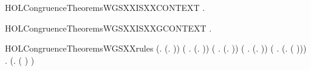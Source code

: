\newcommand{\HOLCongruenceTheoremsWGSXXind}{\UseVerbatim{HOLCongruenceTheoremsWGSXXind}}
\begin{SaveVerbatim}{HOLCongruenceTheoremsWGSXXISXXCONTEXT}
\HOLTokenTurnstile{} \HOLSymConst{\HOLTokenForall{}}.   \HOLSymConst{\HOLTokenImp{}}  
\end{SaveVerbatim}
\newcommand{\HOLCongruenceTheoremsWGSXXISXXCONTEXT}{\UseVerbatim{HOLCongruenceTheoremsWGSXXISXXCONTEXT}}
\begin{SaveVerbatim}{HOLCongruenceTheoremsWGSXXISXXGCONTEXT}
\HOLTokenTurnstile{} \HOLSymConst{\HOLTokenForall{}}.   \HOLSymConst{\HOLTokenImp{}}  
\end{SaveVerbatim}
\newcommand{\HOLCongruenceTheoremsWGSXXISXXGCONTEXT}{\UseVerbatim{HOLCongruenceTheoremsWGSXXISXXGCONTEXT}}
\begin{SaveVerbatim}{HOLCongruenceTheoremsWGSXXrules}
\HOLTokenTurnstile{} (\HOLSymConst{\HOLTokenForall{}}.  (\HOLTokenLambda{}. )) \HOLSymConst{\HOLTokenConj{}} (\HOLSymConst{\HOLTokenForall{}} .   \HOLSymConst{\HOLTokenImp{}}  (\HOLTokenLambda{}.  )) \HOLSymConst{\HOLTokenConj{}}
   (\HOLSymConst{\HOLTokenForall{}}   .
          \HOLSymConst{\HOLTokenConj{}}   \HOLSymConst{\HOLTokenImp{}}
         (\HOLTokenLambda{}.   \HOLSymConst{\ensuremath{+}}  )) \HOLSymConst{\HOLTokenConj{}}
   (\HOLSymConst{\HOLTokenForall{}} .   \HOLSymConst{\HOLTokenConj{}}   \HOLSymConst{\HOLTokenImp{}}  (\HOLTokenLambda{}.   \HOLSymConst{\ensuremath{\parallel}}  )) \HOLSymConst{\HOLTokenConj{}}
   (\HOLSymConst{\HOLTokenForall{}} .   \HOLSymConst{\HOLTokenImp{}}  (\HOLTokenLambda{}. \HOLConst{\ensuremath{\nu}}  ( ))) \HOLSymConst{\HOLTokenConj{}}
   \HOLSymConst{\HOLTokenForall{}} .   \HOLSymConst{\HOLTokenImp{}}  (\HOLTokenLambda{}.  ( ) )
\end{SaveVerbatim}
